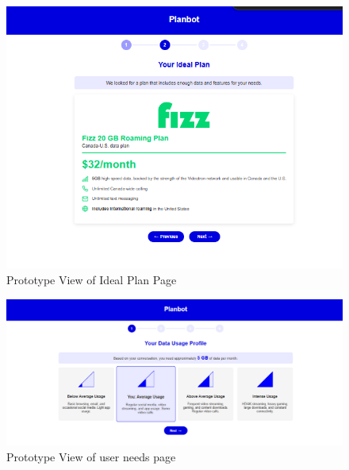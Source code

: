 \documentclass[conference]{IEEEtran}
\begin{document}
\begin{figure}[H]
    \centering
    \includegraphics[width=1\linewidth]{Prototype V1/IdealPlan.png}
    \caption{Prototype View of Ideal Plan Page}
    \label{fig:user flow}
\end{figure}
\begin{figure}[H]
    \centering
    \includegraphics[width=1\linewidth]{Prototype V1/UserNeeds.png}
    \caption{Prototype View of user needs page}
    \label{fig:user flow}
\end{figure}
\end{document}
